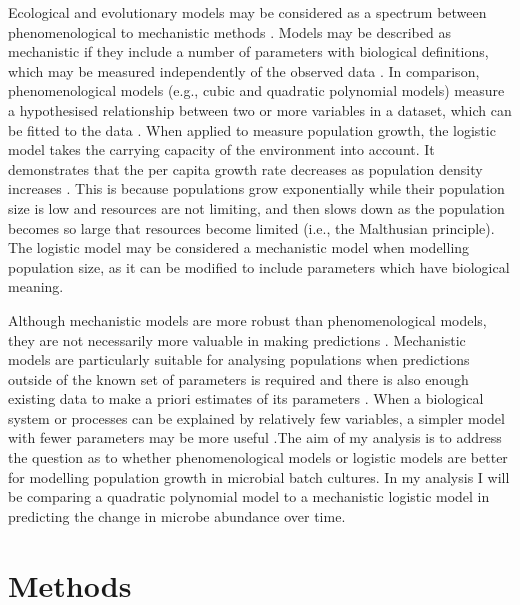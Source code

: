 \documentclass{article}
\begin{document}
\begin{flushleft}
Ecological and evolutionary models may be considered as a spectrum between phenomenological to mechanistic methods \cite{white2019should}. Models may be described as mechanistic if they include a number of parameters with biological definitions, which may be measured independently of the observed data \cite{transtrum2016bridging}\cite{white2019should}. In comparison, phenomenological models (e.g., cubic and quadratic polynomial models) measure a hypothesised relationship between two or more variables in a dataset, which can be fitted to the data \cite{white2019should}. When applied to measure population growth, the logistic model takes the carrying capacity of the environment into account. It demonstrates that the per capita growth rate decreases as population density increases \cite{stefan2012mathematical}. This is because populations grow exponentially while their population size is low and resources are not limiting, and then slows down as the population becomes so large that resources become limited (i.e., the Malthusian principle). The logistic model may be considered a mechanistic model when modelling population size, as it can be modified to include parameters which have biological meaning.
\linebreak


Although mechanistic models are more robust than phenomenological models, they are not necessarily more valuable in making predictions \cite{white2019should}. Mechanistic models are particularly suitable for analysing populations when predictions outside of the known set of parameters is required and there is also enough existing data to make a priori estimates of its parameters \cite{white2019should}. When a biological system or processes can be explained by relatively few variables, a simpler model with fewer parameters may be more useful \cite{transtrum2016bridging}.The aim of my analysis is to address the question as to whether phenomenological models or logistic models are better for modelling population growth in microbial batch cultures. In my analysis I will be comparing a quadratic polynomial model to a mechanistic logistic model in predicting the change in microbe abundance over time.

\newpage
\section{Methods}

\end{flushleft}
\end{document}
